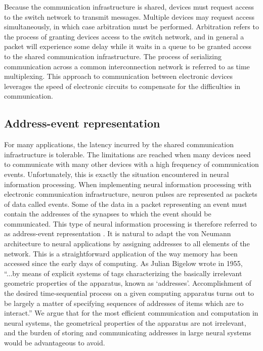 \documentclass[twocolumn]{article}
\begin{document}
Because the communication infrastructure is shared, devices must request access to the switch network to transmit messages. Multiple devices may request access simultaneously, in which case arbitration must be performed. Arbitration refers to the process of granting devices access to the switch network, and in general a packet will experience some delay while it waits in a queue to be granted access to the shared communication infrastructure. The process of serializing communication across a common interconnection network is referred to as time multiplexing. This approach to communication between electronic devices leverages the speed of electronic circuits to compensate for the difficulties in communication. 

\subsection{Address-event representation}
For many applications, the latency incurred by the shared communication infrastructure is tolerable. The limitations are reached when many devices need to communicate with many other devices with a high frequency of communication events. Unfortunately, this is exactly the situation encountered in neural information processing. When implementing neural information processing with electronic communication infrastructure, neuron pulses are represented as packets of data called events. Some of the data in a packet representing an event must contain the addresses of the synapses to which the event should be communicated. This type of neural information processing is therefore referred to as address-event representation \cite{bo2000}. It is natural to adapt the von Neumann architecture to neural applications by assigning addresses to all elements of the network. This is a straightforward application of the way memory has been accessed since the early days of computing. As Julian Bigelow wrote in 1955, ``...by means of explicit systems of tags characterizing the basically irrelevant geometric properties of the apparatus, known as `addresses'. Accomplishment of the desired time-sequential process on a given computing apparatus turns out to be largely a matter of specifying sequences of addresses of items which are to interact.'' \cite{bi1955} We argue that for the most efficient communication and computation in neural systems, the geometrical properties of the apparatus are not irrelevant, and the burden of storing and communicating addresses in large neural systems would be advantageous to avoid.
\end{document}
